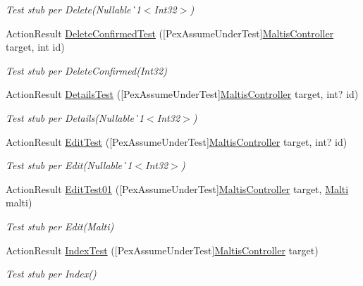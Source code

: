 \begin{DoxyCompactItemize}
\begin{DoxyCompactList}\small\item\em Test stub per Delete(Nullable\`{}1$<$Int32$>$)\end{DoxyCompactList}\item 
Action\+Result \mbox{\hyperlink{class_brew_day2_1_1_tests_1_1_maltis_controller_test_a703230da4209f4b20ded138f7e17331b}{Delete\+Confirmed\+Test}} (\mbox{[}Pex\+Assume\+Under\+Test\mbox{]}\mbox{\hyperlink{class_brew_day2_1_1_controllers_1_1_maltis_controller}{Maltis\+Controller}} target, int id)
\begin{DoxyCompactList}\small\item\em Test stub per Delete\+Confirmed(\+Int32)\end{DoxyCompactList}\item 
Action\+Result \mbox{\hyperlink{class_brew_day2_1_1_tests_1_1_maltis_controller_test_a875344b19b83444d97ba00702bc999e6}{Details\+Test}} (\mbox{[}Pex\+Assume\+Under\+Test\mbox{]}\mbox{\hyperlink{class_brew_day2_1_1_controllers_1_1_maltis_controller}{Maltis\+Controller}} target, int? id)
\begin{DoxyCompactList}\small\item\em Test stub per Details(Nullable\`{}1$<$Int32$>$)\end{DoxyCompactList}\item 
Action\+Result \mbox{\hyperlink{class_brew_day2_1_1_tests_1_1_maltis_controller_test_a68aefd016f69f6691415156cf56f6771}{Edit\+Test}} (\mbox{[}Pex\+Assume\+Under\+Test\mbox{]}\mbox{\hyperlink{class_brew_day2_1_1_controllers_1_1_maltis_controller}{Maltis\+Controller}} target, int? id)
\begin{DoxyCompactList}\small\item\em Test stub per Edit(Nullable\`{}1$<$Int32$>$)\end{DoxyCompactList}\item 
Action\+Result \mbox{\hyperlink{class_brew_day2_1_1_tests_1_1_maltis_controller_test_a3864963363a863708918f40b2553d1c6}{Edit\+Test01}} (\mbox{[}Pex\+Assume\+Under\+Test\mbox{]}\mbox{\hyperlink{class_brew_day2_1_1_controllers_1_1_maltis_controller}{Maltis\+Controller}} target, \mbox{\hyperlink{class_brew_day2_1_1_models_1_1_malti}{Malti}} malti)
\begin{DoxyCompactList}\small\item\em Test stub per Edit(\+Malti)\end{DoxyCompactList}\item 
Action\+Result \mbox{\hyperlink{class_brew_day2_1_1_tests_1_1_maltis_controller_test_a9a2610a29b4f116e3b1ea9220da08042}{Index\+Test}} (\mbox{[}Pex\+Assume\+Under\+Test\mbox{]}\mbox{\hyperlink{class_brew_day2_1_1_controllers_1_1_maltis_controller}{Maltis\+Controller}} target)
\begin{DoxyCompactList}\small\item\em Test stub per Index()\end{DoxyCompactList}\end{DoxyCompactItemize}


